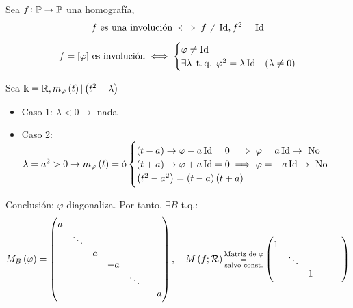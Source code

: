 \begin{defi}
    Sea $f \colon \mathbb{P} \to \mathbb{P}$ una homografía,
    \[ f\text{ es una involución} \iff f \neq \operatorname{Id}, f^2 = \operatorname{Id} \]
\end{defi}
\begin{obs}
    \[
        f = [\varphi]\text{ es involución} \iff
        \begin{cases}
            \varphi \neq \operatorname{Id}  \\
            \exists\lambda\operatorname{\;t.q.\;}\varphi^2=\lambda\operatorname{Id} & \left( \lambda \neq 0 \right)
        \end{cases}
    \]
\end{obs}
\begin{obs}
    Sea $\Bbbk = \mathbb{R}, m_\varphi\left( t\right) | \left( t^2-\lambda\right)$
    \begin{itemize}
        \item Caso 1: $\lambda<0 \rightarrow$ nada 
        \item Caso 2: $\lambda = a^2>0 \rightarrow m_\varphi\left( t\right) = \text{ó}
        \begin{cases}
            \left( t-a\right) \rightarrow \varphi -a\operatorname{Id}=0\implies\varphi=a\operatorname{Id} \rightarrow \text{ No} \\
            \left( t+a\right) \rightarrow \varphi +a\operatorname{Id}=0\implies\varphi=-a\operatorname{Id} \rightarrow \text{ No} \\
            \left( t^2-a^2\right) = \left( t-a\right)\left( t+a\right)
        \end{cases}$
    \end{itemize}
    Conclusión: $\varphi$ diagonaliza.
    Por tanto, $\exists B$ t.q.:
    \begin{gather*}
        M_B\left(\varphi\right) =
        \begin{pmatrix}
            a & & & & & \\
            & \ddots & & & & \\
            & & a & & & \\
            & & & -a & & \\
            & & & & \ddots & \\
            & & & & & -a
        \end{pmatrix}, \quad
        M\left( f;\mathcal{R}\right) \substack{\text{Matriz de } \varphi \\=\\ \text{salvo const.}} \begin{pmatrix}
            1 & & & & & \\
            & \ddots & & & & \\
            & & 1 & & & \\

\end{pmatrix}
\end{gather*}
\end{obs}
